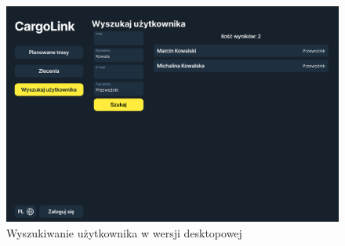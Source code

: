 \begin{figure}[H]
	\centering
		\includegraphics[width=0.7\linewidth]{rozdzial1/szukaj_uzytkownika_d.jpg}
	\caption{Wyszukiwanie użytkownika w wersji desktopowej}
	\label{Rys. fig:Wyszukiwanie użytkownika - destkop}
\end{figure}

